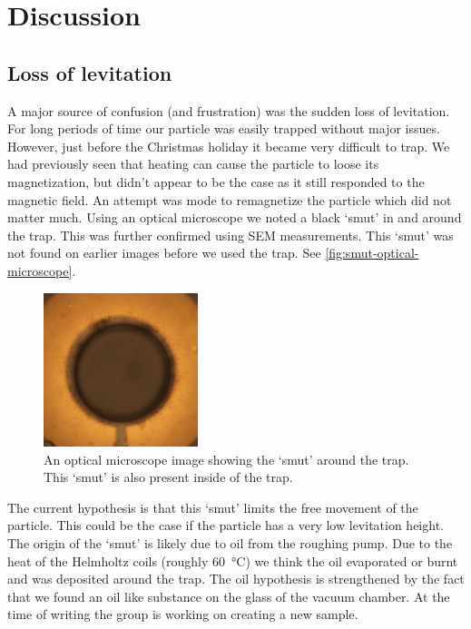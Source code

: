 \chapter{Discussion}
\label{chap:discussion}

\section*{Loss of levitation}
A major source of confusion (and frustration) was the sudden loss of levitation. For long periods of time our particle was easily trapped without major issues. However, just before the Christmas holiday it became very difficult to trap. We had previously seen that heating can cause the particle to loose its magnetization, but didn't appear to be the case as it still responded to the magnetic field. An attempt was mode to remagnetize the particle which did not matter much. Using an optical microscope we noted a black `smut' in and around the trap. This was further confirmed using SEM measurements. This `smut' was not found on earlier images before we used the trap. See \autoref{fig:smut-optical-microscope}.

\begin{figure}
    \centering
    \includegraphics[width=0.4\textwidth]{figures/sample/dirt_optical_microscope.jpeg}
    \caption{An optical microscope image showing the `smut' around the trap. This `smut' is also present inside of the trap.}
    \label{fig:smut-optical-microscope}
\end{figure}

The current hypothesis is that this `smut' limits the free movement of the particle. This could be the case if the particle has a very low levitation height. The origin of the `smut' is likely due to oil from the roughing pump. Due to the heat of the Helmholtz coils (roughly \qty{60}{\celsius}) we think the oil evaporated or burnt and was deposited around the trap. The oil hypothesis is strengthened by the fact that we found an oil like substance on the glass of the vacuum chamber. At the time of writing the group is working on creating a new sample.

